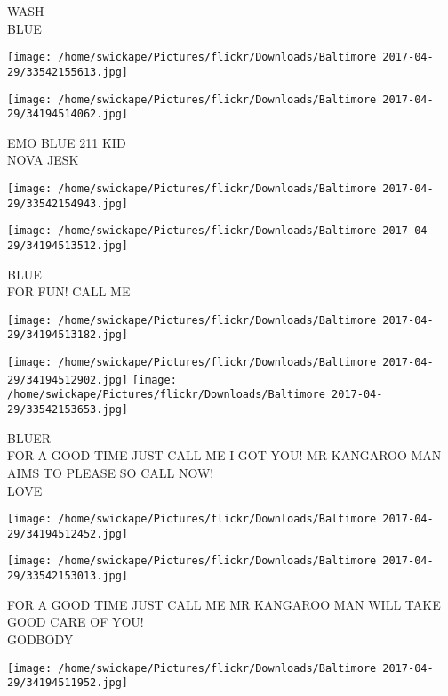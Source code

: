 \documentclass[10pt,letterpaper]{article}
\begin{document}
WASH\\
BLUE\\
\pagebreak

\texttt{[image: /home/swickape/Pictures/flickr/Downloads/Baltimore 2017-04-29/33542155613.jpg]}

\vspace{0.25in}
\texttt{[image: /home/swickape/Pictures/flickr/Downloads/Baltimore 2017-04-29/34194514062.jpg]}

EMO BLUE 211 KID\\
NOVA JESK\\
\pagebreak

\texttt{[image: /home/swickape/Pictures/flickr/Downloads/Baltimore 2017-04-29/33542154943.jpg]}

\vspace{0.25in}
\texttt{[image: /home/swickape/Pictures/flickr/Downloads/Baltimore 2017-04-29/34194513512.jpg]}

BLUE\\
FOR FUN!  CALL ME\\
\pagebreak

\texttt{[image: /home/swickape/Pictures/flickr/Downloads/Baltimore 2017-04-29/34194513182.jpg]}

\vspace{0.25in}
\texttt{[image: /home/swickape/Pictures/flickr/Downloads/Baltimore 2017-04-29/34194512902.jpg]}
\texttt{[image: /home/swickape/Pictures/flickr/Downloads/Baltimore 2017-04-29/33542153653.jpg]}

BLUER\\
FOR A GOOD TIME JUST CALL ME I GOT YOU!  MR KANGAROO MAN AIMS TO PLEASE SO CALL NOW!\\
LOVE\\
\pagebreak

\texttt{[image: /home/swickape/Pictures/flickr/Downloads/Baltimore 2017-04-29/34194512452.jpg]}

\vspace{0.25in}
\texttt{[image: /home/swickape/Pictures/flickr/Downloads/Baltimore 2017-04-29/33542153013.jpg]}

FOR A GOOD TIME JUST CALL ME MR KANGAROO MAN WILL TAKE GOOD CARE OF YOU!\\
GODBODY\\
\pagebreak

\texttt{[image: /home/swickape/Pictures/flickr/Downloads/Baltimore 2017-04-29/34194511952.jpg]}
\end{document}
